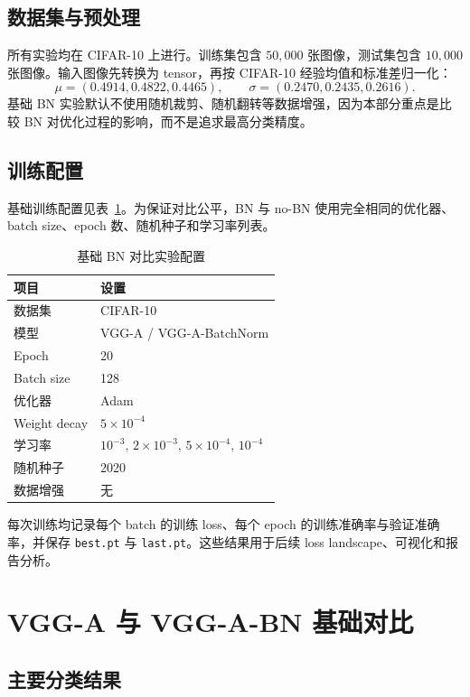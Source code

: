 \documentclass[UTF8,a4paper,11pt]{ctexart}
\begin{document}
\subsection{数据集与预处理}

所有实验均在 CIFAR-10 上进行。训练集包含 $50{,}000$ 张图像，测试集包含 $10{,}000$ 张图像。输入图像先转换为 tensor，再按 CIFAR-10 经验均值和标准差归一化：
\[
\mu=(0.4914,0.4822,0.4465),\qquad
\sigma=(0.2470,0.2435,0.2616).
\]
基础 BN 实验默认不使用随机裁剪、随机翻转等数据增强，因为本部分重点是比较 BN 对优化过程的影响，而不是追求最高分类精度。

\subsection{训练配置}

基础训练配置见表~\ref{tab:base_config}。为保证对比公平，BN 与 no-BN 使用完全相同的优化器、batch size、epoch 数、随机种子和学习率列表。

\begin{table}[H]
  \centering
  \caption{基础 BN 对比实验配置}
  \label{tab:base_config}
  \begin{tabular}{ll}
    \toprule
    项目 & 设置 \\
    \midrule
    数据集 & CIFAR-10 \\
    模型 & VGG-A / VGG-A-BatchNorm \\
    Epoch & 20 \\
    Batch size & 128 \\
    优化器 & Adam \\
    Weight decay & $5\times10^{-4}$ \\
    学习率 & $10^{-3},\,2\times10^{-3},\,5\times10^{-4},\,10^{-4}$ \\
    随机种子 & 2020 \\
    数据增强 & 无 \\
    \bottomrule
  \end{tabular}
\end{table}

每次训练均记录每个 batch 的训练 loss、每个 epoch 的训练准确率与验证准确率，并保存 \texttt{best.pt} 与 \texttt{last.pt}。这些结果用于后续 loss landscape、可视化和报告分析。

\section{VGG-A 与 VGG-A-BN 基础对比}

\subsection{主要分类结果}
\end{document}
